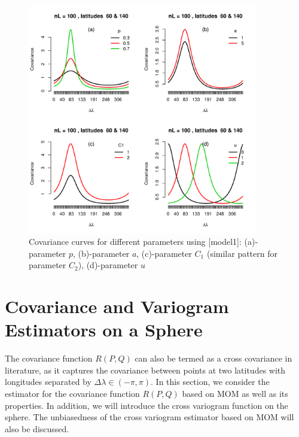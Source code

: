 			\begin{figure}[H]
				\centering
				\includegraphics[width=0.9\textwidth]{graphs/parameters_model1_2}
				\caption[Covariance Curves For Different Parameters Using Model1:] {Covariance curves for different parameters using \cite{Huang2012}[model1]:  (a)-parameter $p$, (b)-parameter $a$, (c)-parameter $C_1$ (similar pattern for parameter $C_2$), (d)-parameter $u$}
				\label{fig_parameter_comp}
			\end{figure}
			

\vskip 24pt 

			\section{Covariance and Variogram Estimators on a Sphere}

The covariance function $R(P, Q)$ can also be termed as a cross covariance in literature, as it captures the covariance between points at two latitudes with longitudes separated by $\Delta \lambda \in (-\pi,\pi)$. In this section, we consider the estimator for the covariance function $R(P, Q)$ based on MOM as well as its properties. In addition, we will introduce the cross variogram function on the sphere. The unbiasedness of the cross variogram estimator based on MOM will also be discussed.


